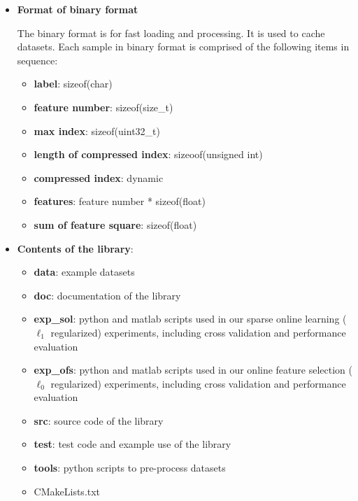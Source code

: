 \documentclass[11pt,a4paper]{article}
\newlength{\wideitemsep}
\let\olditem\item
\renewcommand{\item}{\setlength{\itemsep}{\wideitemsep}\olditem}
\begin{document}
\begin{itemize}
    \item \textbf{Format of binary format}

        The binary format is for fast loading and processing. It is used to cache
        datasets. Each sample in binary format is comprised of the following
        items in sequence:
        \begin{itemize}
            \item \textbf{label}: sizeof(char)
            \item \textbf{feature number}: sizeof(size\_t)
            \item \textbf{max index}: sizeof(uint32\_t)
            \item \textbf{length of compressed index}: sizeoof(unsigned int) 
            \item \textbf{compressed index}: dynamic 
            \item \textbf{features}: feature number * sizeof(float)
            \item \textbf{sum of feature square}: sizeof(float)
        \end{itemize}

    \item \textbf{Contents of the library}:
        \begin{itemize}
            \item   \textbf{data}: example datasets 
            \item   \textbf{doc}: documentation of the library
            \item   \textbf{exp\_sol}: python and matlab scripts used in our
                sparse online learning ($\ell_1$ regularized) experiments, including cross validation and performance evaluation
            \item   \textbf{exp\_ofs}: python and matlab scripts used in our
                online feature selection ($\ell_0$ regularized) experiments, including cross validation and performance evaluation
            \item   \textbf{src}: source code of the library
            \item   \textbf{test}: test code and example use of the library
            \item   \textbf{tools}: python scripts to pre-process datasets
            \item   CMakeLists.txt
        \end{itemize}
\end{itemize}
\end{document}
